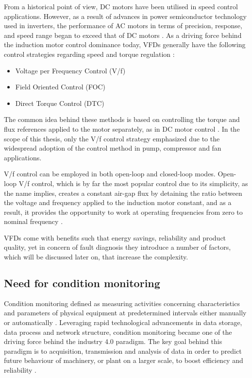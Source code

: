 From a historical point of view, DC motors have been utilised in speed control applications. However, as a result of advances in power semiconductor technology used in inverters, the performance of AC motors in terms of precision, response, and speed range began to exceed that of DC motors \cite{doe2008improving,mikami2011historical}. As a driving force behind the induction motor control dominance today, VFDs generally have the following control strategies regarding speed and torque regulation \cite{weg,danfoss}:

\begin{itemize}
	\item Voltage per Frequency Control (V/f)
	\item Field Oriented Control (FOC)
	\item Direct Torque Control (DTC)
\end{itemize}

The common idea behind these methods is based on controlling the torque and flux references applied to the motor separately, as in DC motor control \cite{faiz2017fault}. In the scope of this thesis, only the V/f control strategy emphasized due to the widespread adoption of the control method in pump, compressor and fan applications. 

V/f control can be employed in both open-loop and closed-loop modes. Open-loop V/f control, which is by far the most popular control due to its simplicity, as the name implies, creates a constant air-gap flux by detaining the ratio between the voltage and frequency applied to the induction motor constant, and as a result, it provides the opportunity to work at operating frequencies from zero to nominal frequency \cite{bose2002modern}. 

VFDs come with benefits such that energy savings, reliability and product quality, yet in concern of fault diagnosis they introduce a number of factors, which will be discussed later on, that increase the complexity. 

\subsection{Need for condition monitoring}

Condition monitoring defined as measuring activities concerning characteristics and parameters of physical equipment at predetermined intervals either manually or automatically \cite{en201713306}. Leveraging rapid technological advancements in data storage, data process and network structure, condition monitoring became one of the driving force behind the industry 4.0 paradigm. The key goal behind this paradigm is to acquisition, transmission and analysis of data in order to predict future behaviour of machinery, or plant on a larger scale, to boost efficiency and reliability \cite{lughofer2019prologue,RUIZSARMIENTO}. 

